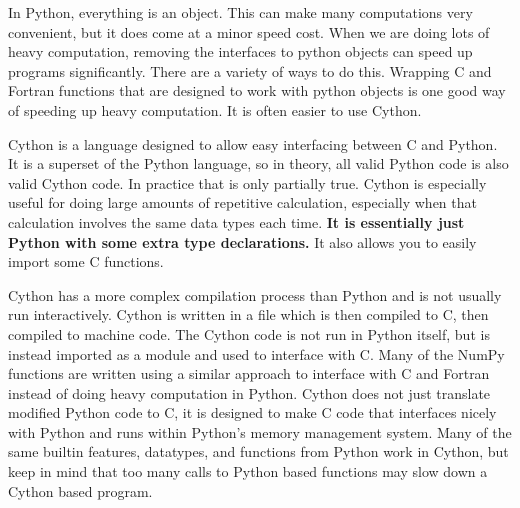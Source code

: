 \label{lab:Cython}


In Python, everything is an object.
This can make many computations very convenient, but it does come at a minor speed cost.
When we are doing lots of heavy computation, removing the interfaces to python objects can speed up programs significantly.
There are a variety of ways to do this.
Wrapping C and Fortran functions that are designed to work with python objects is one good way of speeding up heavy computation.
It is often easier to use Cython.

Cython is a language designed to allow easy interfacing between C and Python.
It is a superset of the Python language, so in theory, all valid Python code is also valid Cython code.
In practice that is only partially true.
Cython is especially useful for doing large amounts of repetitive calculation, especially when that calculation involves the same data types each time.
\textbf{It is essentially just Python with some extra type declarations.}
It also allows you to easily import some C functions.

Cython has a more complex compilation process than Python and is not usually run interactively.
Cython is written in a  file which is then compiled to C, then compiled to machine code.
The Cython code is not run in Python itself, but is instead imported as a module and used to interface with C.
Many of the NumPy functions are written using a similar approach to interface with C and Fortran instead of doing heavy computation in Python.
Cython does not just translate modified Python code to C, it is designed to make C code that interfaces nicely with Python and runs within Python's memory management system.
Many of the same builtin features, datatypes, and functions from Python work in Cython, but keep in mind that too many calls to Python based functions may slow down a Cython based program.

